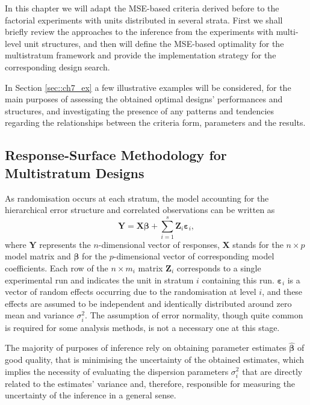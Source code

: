 In this chapter we will adapt the MSE-based criteria derived before to the factorial experiments with units distributed in several strata. First we shall briefly review the approaches to the inference from the experiments with multi-level unit structures, and then will define the MSE-based optimality for the multistratum framework and provide the implementation strategy for the corresponding design search.

In Section \ref{sec::ch7_ex} a few illustrative examples will be considered, for the main purposes of assessing the obtained optimal designs' performances and structures, and investigating the presence of any patterns and tendencies regarding the relationships between the criteria form, parameters and the results. 

\subsection{Response-Surface Methodology for Multistratum Designs}
As randomisation occurs at each stratum, the model accounting for the hierarchical error structure and correlated observations can be written as
\begin{equation}
\label{eq::MS_model}
\bm{Y}=\bm{X}\bm{\beta}+\sum_{i=1}^{s}\bm{Z}_{i}\bm{\varepsilon}_{i},
\end{equation}
where $\bm{Y}$ represents the $n$-dimensional vector of responses, $\bm{X}$ stands for the $n \times p$ model matrix and $\bm{\beta}$ for the $p$-dimensional vector of corresponding model coefficients. Each row of the $n\times m_{i}$ matrix $\bm{Z}_{i}$ corresponds to a single experimental run and indicates the unit in stratum $i$ containing this run. $\bm{\varepsilon}_{i}$ is a vector of random effects occurring due to the randomisation at level $i$, and these effects are assumed to be independent and identically distributed around zero mean and variance $\sigma^{2}_{i}$. The assumption of error normality, though quite common is required for some analysis methods, is not a necessary one at this stage.

The majority of purposes of inference rely on obtaining parameter estimates $\bm{\hat{\beta}}$ of good quality, that is minimising the uncertainty of the obtained estimates, which implies the necessity of evaluating the dispersion parameters $\sigma^2_{i}$ that are directly related to the estimates' variance and, therefore, responsible for measuring the uncertainty of the inference in a general sense.

